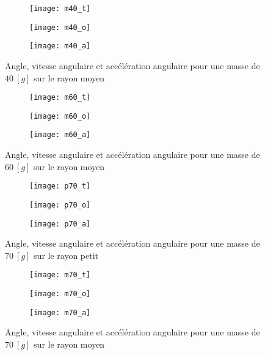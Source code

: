 \begin{figure}[H]
\centering
\begin{subfigure}[t]{.3\linewidth}
\centering
\texttt{[image: m40\_t]}
\end{subfigure}
\begin{subfigure}[t]{.3\linewidth}
\centering
\texttt{[image: m40\_o]}
\end{subfigure}
\begin{subfigure}[t]{.3\linewidth}
\centering
\texttt{[image: m40\_a]}
\end{subfigure}
\caption{Angle, vitesse angulaire et accélération angulaire pour une masse de $40 \ [g]$ sur le rayon moyen}
\label{fig:m40}
\end{figure}

\begin{figure}[H]
\centering
\begin{subfigure}[t]{.3\linewidth}
\centering
\texttt{[image: m60\_t]}
\end{subfigure}
\begin{subfigure}[t]{.3\linewidth}
\centering
\texttt{[image: m60\_o]}
\end{subfigure}
\begin{subfigure}[t]{.3\linewidth}
\centering
\texttt{[image: m60\_a]}
\end{subfigure}
\caption{Angle, vitesse angulaire et accélération angulaire pour une masse de $60 \ [g]$ sur le rayon moyen}
\label{fig:m60}
\end{figure}

\begin{figure}[H]
\centering
\begin{subfigure}[t]{.3\linewidth}
\centering
\texttt{[image: p70\_t]}
\end{subfigure}
\begin{subfigure}[t]{.3\linewidth}
\centering
\texttt{[image: p70\_o]}
\end{subfigure}
\begin{subfigure}[t]{.3\linewidth}
\centering
\texttt{[image: p70\_a]}
\end{subfigure}
\caption{Angle, vitesse angulaire et accélération angulaire pour une masse de $70 \ [g]$ sur le rayon petit}
\label{fig:p70}
\end{figure}

\begin{figure}[H]
\centering
\begin{subfigure}[t]{.3\linewidth}
\centering
\texttt{[image: m70\_t]}
\end{subfigure}
\begin{subfigure}[t]{.3\linewidth}
\centering
\texttt{[image: m70\_o]}
\end{subfigure}
\begin{subfigure}[t]{.3\linewidth}
\centering
\texttt{[image: m70\_a]}
\end{subfigure}
\caption{Angle, vitesse angulaire et accélération angulaire pour une masse de $70 \ [g]$ sur le rayon moyen}
\label{fig:m70}
\end{figure}

